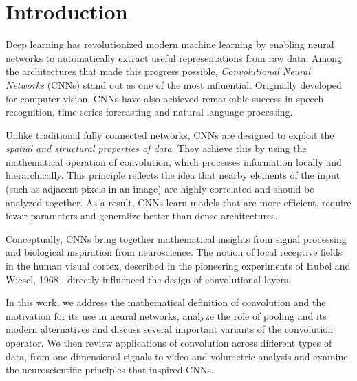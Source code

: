 \chapter*{Introduction}

Deep learning has revolutionized modern machine learning by enabling neural networks to automatically extract useful representations from raw data.  
Among the architectures that made this progress possible, \textit{Convolutional Neural Networks} (CNNs) stand out as one of the most influential.  
Originally developed for computer vision, CNNs have also achieved remarkable success in speech recognition, time-series forecasting and natural language processing.  

Unlike traditional fully connected networks, CNNs are designed to exploit the \textit{spatial and structural properties of data}.  
They achieve this by using the mathematical operation of convolution, which processes information locally and hierarchically.  
This principle reflects the idea that nearby elements of the input (such as adjacent pixels in an image) are highly correlated and should be analyzed together.  
As a result, CNNs learn models that are more efficient, require fewer parameters and generalize better than dense architectures.  

Conceptually, CNNs bring together mathematical insights from signal processing and biological inspiration from neuroscience.  
The notion of local receptive fields in the human visual cortex, described in the pioneering experiments of Hubel and Wiesel, 1968 \cite{hubel1968}, directly influenced the design of convolutional layers.   

In this work, we address the mathematical definition of convolution and the motivation for its use in neural networks, analyze the role of pooling and its modern alternatives and discuss several important variants of the convolution operator.  
We then review applications of convolution across different types of data, from one-dimensional signals to video and volumetric analysis and examine the neuroscientific principles that inspired CNNs.